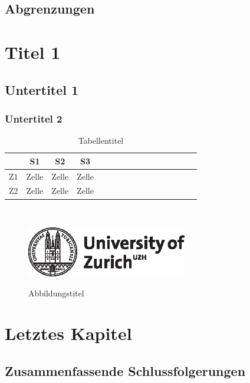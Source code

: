\documentclass[11pt,a4paper,titlepage]{scrartcl}
\begin{document}
\subsection{Abgrenzungen}

\section{Titel 1}
\subsection{Untertitel 1}


\subsubsection{Untertitel 2}


\begin{table}[ht]
\centering
\caption{Tabellentitel}
\begin{tabular}{*{4}{cccc}}\hline\hline
            	&	S1       	&	S2      &	S3     \\  \midrule
Z1  			&	Zelle		&	Zelle	&	Zelle  \\
Z2      		&	Zelle	    &	Zelle	&	Zelle   \\ \bottomrule
\end{tabular}\\
\label{Tabellenlabel}
\end{table}

\begin{figure}[ht]
\caption{Abbildungstitel}
\center
\includegraphics[width=7cm]{uzh.eps} \\
\label{Abbildungslabel}
\end{figure}

\section{Letztes Kapitel}
\subsection{Zusammenfassende Schlussfolgerungen}
\end{document}
